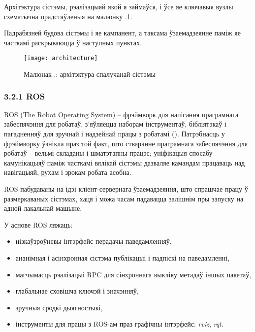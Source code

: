 \vspace{5mm}

Архітэктура сістэмы, рэалізацыяй якой я займаўся, і ўсе яе ключавыя вузлы схематычна
прадстаўленыя на малюнку \cursection.\ref{fig:architecture}.

Падрабязней будова сістэмы і яе кампанент, а таксама ўзаемадзеянне паміж яе часткамі
раскрываюцца ў наступных пунктах.

\begin{figure}[H]
  \centering
  \texttt{[image: architecture]}
  \captionsetup{labelformat=empty}
  \caption{Малюнак \cursection.: архітэктура спалучанай сістэмы}
  \label{fig:architecture}
\end{figure}

\renewcommand{\nextTitle}{3.2.1 ROS}
\addcontentsline{toc}{subsubsection}{\nextTitle}
\subsubsection*{\nextTitle}

ROS (The Robot Operating System) -- фрэймворк для напісання праграмнага забеспячэння
для робатаў, з'яўляецца наборам інструментаў, бібліятэкаў і
пагадненняў для зручнай і надзейнай працы з робатамі (\cite{288}). Патрэбнасць у фрэймворку ўзнікла
праз той факт, што стварэнне праграмнага забеспячэння для робатаў --
вельмі складаны і шматэтапны працэс; уніфікацыя спосабу камунікацыяў паміж часткамі вялікай
сістэмы дазваляе камандам працаваць над навігацыяй, рухам і зрокам робата асобна.

ROS пабудаваны на ідэі кліент-сервернага ўзаемадзеяння, што спрашчае працу ў размеркаваных
сістэмах, хаця і можа часам падавацца залішнім пры запуску на адной лакальнай машыне.

\vspace{4mm}

У аснове ROS ляжаць:

\begin{itemize}
  \item нізкаўзроўневы інтэрфейс перадачы паведамленняў,
  \item ананімная і асінхронная сістэма публікацыі і падпіскі на паведамленні,
  \item магчымасць рэалізацыі RPC для сінхроннага выкліку метадаў іншых пакетаў,
  \item глабальнае сховішча ключэй і значэнняў,
  \item зручныя сродкі дыягностыкі,
  \item інструменты для працы з ROS-ам праз графічны інтэрфейс: \textit{rviz}, \textit{rqt}.
\end{itemize}

